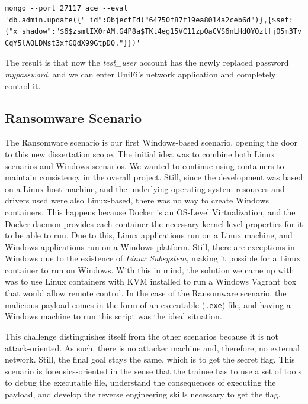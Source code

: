 \begin{lstlisting}[caption=Update Administrator User Account Password.,numbers=none,label={lst:unifi_mongodb_update_admin_password}]
mongo --port 27117 ace --eval 'db.admin.update({"_id":ObjectId("64750f87f19ea8014a2ceb6d")},{$set:{"x_shadow":"$6$zsmtIX0rAM.G4P8a$TKt4eg15VC11zpQaCVS6nLHdOYOzlfjO5m3Tvle7rtc1SOvMRYTT0jBBnRc
CqY5lAOLDNst3xfGQdX99GtpD0."}})'
\end{lstlisting}

The result is that now the \textit{test\_user} account has the newly replaced password \textit{mypassword}, and we can enter UniFi's network application and completely control it.

\subsection{Ransomware Scenario} \label{sec:validation_ransomware_scenario}

The Ransomware scenario is our first Windows-based scenario, opening the door to this new dissertation scope. The initial idea was to combine both Linux scenarios and Windows scenarios. We wanted to continue using containers to maintain consistency in the overall project. Still, since the development was based on a Linux host machine, and the underlying operating system resources and drivers used were also Linux-based, there was no way to create Windows containers. This happens because Docker is an OS-Level Virtualization, and the Docker daemon provides each container the necessary kernel-level properties for it to be able to run. Due to this, Linux applications run on a Linux machine, and Windows applications run on a Windows platform. Still, there are exceptions in Windows due to the existence of \textit{Linux Subsystem}, making it possible for a Linux container to run on Windows. With this in mind, the solution we came up with was to use Linux containers with KVM installed to run a Windows Vagrant box that would allow remote control. In the case of the Ransomware scenario, the malicious payload comes in the form of an executable (\texttt{.exe}) file, and having a Windows machine to run this script was the ideal situation. 

This challenge distinguishes itself from the other scenarios because it is not attack-oriented. As such, there is no attacker machine and, therefore, no external network. Still, the final goal stays the same, which is to get the secret flag. This scenario is forensics-oriented in the sense that the trainee has to use a set of tools to debug the executable file, understand the consequences of executing the payload, and develop the reverse engineering skills necessary to get the flag.

